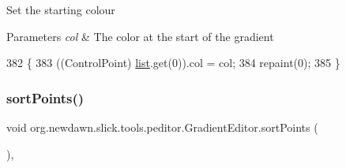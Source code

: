 Set the starting colour


\begin{DoxyParams}{Parameters}
{\em col} & The color at the start of the gradient \\
\hline
\end{DoxyParams}

\begin{DoxyCode}
382                                     \{
383         ((ControlPoint) \mbox{\hyperlink{classorg_1_1newdawn_1_1slick_1_1tools_1_1peditor_1_1_gradient_editor_aa53704ef8438035eb76c8c6aab8af133}{list}}.get(0)).col = col;
384         repaint(0);
385     \}
\end{DoxyCode}
\mbox{\label{classorg_1_1newdawn_1_1slick_1_1tools_1_1peditor_1_1_gradient_editor_a86a44e97d8aca663dba524a63a28649b}} 
\subsubsection{\texorpdfstring{sort\+Points()}{sortPoints()}}
{\footnotesize\ttfamily void org.\+newdawn.\+slick.\+tools.\+peditor.\+Gradient\+Editor.\+sort\+Points (\begin{DoxyParamCaption}{ }\end{DoxyParamCaption})\hspace{0.3cm}{\ttfamily [inline]}, {\ttfamily [private]}}


